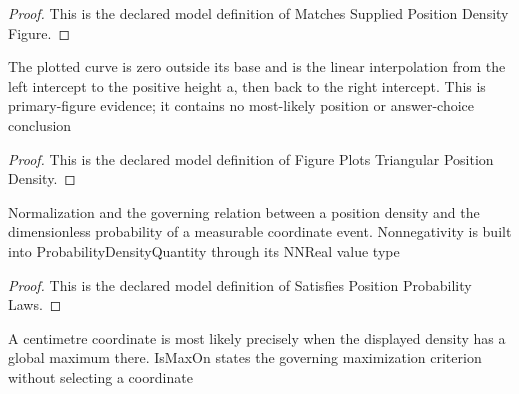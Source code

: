 \begin{proof}
  This is the declared model definition of Matches Supplied Position Density Figure.
\end{proof}
\begin{definition}
  \label{def:physics:phyx-mini-0653:phyxminiproblems-problemphyxmini0653-figureplotstriangularpositiondensity}
  The plotted curve is zero outside its base and is the linear interpolation from the left intercept to the positive height a, then back to the right intercept. This is primary-figure evidence; it contains no most-likely position or answer-choice conclusion
\end{definition}
\begin{proof}
  This is the declared model definition of Figure Plots Triangular Position Density.
\end{proof}
\begin{definition}
  \label{def:physics:phyx-mini-0653:phyxminiproblems-problemphyxmini0653-satisfiespositionprobabilitylaws}
  Normalization and the governing relation between a position density and the dimensionless probability of a measurable coordinate event. Nonnegativity is built into ProbabilityDensityQuantity through its NNReal value type
\end{definition}
\begin{proof}
  This is the declared model definition of Satisfies Position Probability Laws.
\end{proof}
\begin{definition}
  \label{def:physics:phyx-mini-0653:phyxminiproblems-problemphyxmini0653-ismostlikelycoordinatecm}
  A centimetre coordinate is most likely precisely when the displayed density has a global maximum there. IsMaxOn states the governing maximization criterion without selecting a coordinate
\end{definition}
